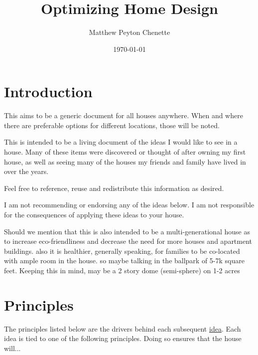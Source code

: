 \documentclass{article}
\title{Optimizing Home Design}
\author{Matthew Peyton Chenette}
\date{\today}
\begin{document}
\maketitle
\clearpage
\tableofcontents
\clearpage

\section{Introduction}
This aims to be a generic document for all houses anywhere. When and where there are preferable options for different locations, those will be noted.

This is intended to be a living document of the ideas I would like to see in a house. Many of these items were discovered or thought of after owning my first house, as well as seeing many of the houses my friends and family have lived in over the years.

Feel free to reference, reuse and redistribute this information as desired.

I am not recommending or endorsing any of the ideas below.  
I am not responsible for the consequences of applying these ideas to your house.

Should we mention that this is also intended to be a multi-generational house as to increase eco-friendliness and decrease the need for more houses and apartment buildings. also it is healthier, generally speaking, for families to be co-located with ample room in the house. so maybe talking in the ballpark of 5-7k square feet. Keeping this in mind, may be a 2 story dome (semi-sphere) on 1-2 acres

\clearpage

\section{Principles}
The principles listed below are the drivers behind each subsequent \hyperref[ideas]{idea}. Each idea is tied to one of the following principles. Doing so ensures that the house will...



\end{document}
